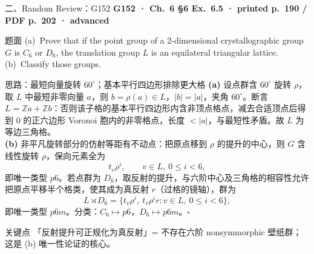 \documentclass[aspectratio=169,10pt,fontset=none]{ctexbeamer}
\newcommand{\ex}[1]{\textcolor{accent}{\footnotesize\bfseries #1}}
\begin{document}
\begin{frame}[t]{二、Random Review：G152}
  \leavevmode\ex{G152 · Ch.~6 §6 Ex.~6.5 · printed p.~190 / PDF p.~202 · advanced}
  \begin{block}{\footnotesize 题面}
    \scriptsize (a)~Prove that if the point group of a 2-dimensional crystallographic group $G$ is $C_6$ or $D_6$, the translation group $L$ is an equilateral triangular lattice. (b)~Classify those groups.
  \end{block}
  \begin{exampleblock}{\footnotesize 思路：最短向量旋转 $60^\circ$；基本平行四边形排除更大格}
    \scriptsize
    \textbf{(a)} 设点群含 $60^\circ$ 旋转 $\rho$，取 $L$ 中最短非零向量 $a$，则 $b=\rho(a)\in L$，$|b|=|a|$，夹角 $60^\circ$。断言 $L=\mathbb Za+\mathbb Zb$：否则该子格的基本平行四边形内含非顶点格点，减去合适顶点后得到 $0$ 的正六边形 Voronoi 胞内的非零格点，长度 $<|a|$，与最短性矛盾。故 $L$ 为等边三角格。\\[2pt]
    \textbf{(b)} 非平凡旋转部分的仿射等距有不动点：把原点移到 $\rho$ 的提升的中心，则 $G$ 含线性旋转 $\rho$，保向元素全为
    $$t_v\rho^i,\qquad v\in L,\ 0\le i<6,$$
    即唯一类型 $p6$。若点群为 $D_6$，取反射的提升，与六阶中心及三角格的相容性允许把原点平移半个格类，使其成为真反射 $r$（过格的镜轴），群为
    $$L\rtimes D_6=\{t_v\rho^i,\ t_v\rho^i r:v\in L,\ 0\le i<6\},$$
    即唯一类型 $p6m$。分类：$C_6\mapsto p6$，$D_6\mapsto p6m$。$\square$
  \end{exampleblock}
  \begin{block}{\footnotesize 关键点}
    \scriptsize 「反射提升可正规化为真反射」= 不存在六阶 nonsymmorphic 壁纸群；这是 (b) 唯一性论证的核心。
  \end{block}
\end{frame}
\end{document}
